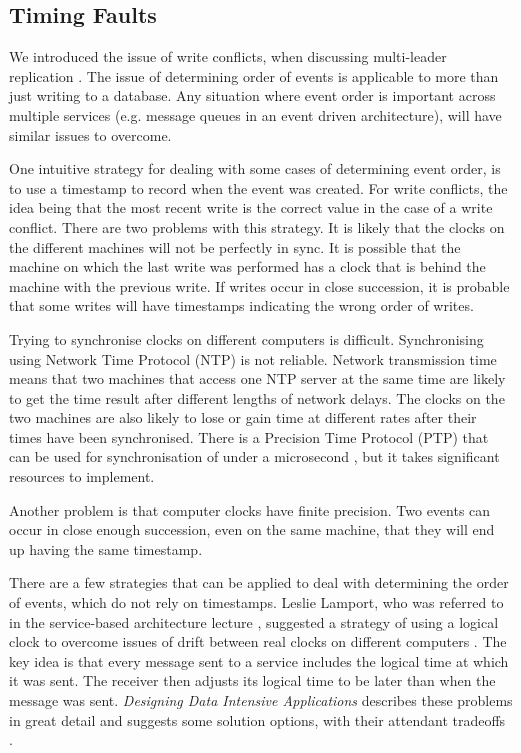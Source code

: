\subsection{Timing Faults}\label{timing}
We introduced the issue of write conflicts, when discussing multi-leader replication \cite{distributed2-notes}.
The issue of determining order of events is applicable to more than just writing to a database.
Any situation where event order is important across multiple services (e.g. message queues in an event driven architecture),
will have similar issues to overcome.

One intuitive strategy for dealing with some cases of determining event order,
is to use a timestamp to record when the event was created.
For write conflicts, the idea being that the most recent write is the correct value in the case of a write conflict.
There are two problems with this strategy.
It is likely that the clocks on the different machines will not be perfectly in sync.
It is possible that the machine on which the last write was performed has a clock that is behind the machine with the previous write.
If writes occur in close succession, it is probable that some writes will have timestamps indicating the wrong order of writes.

Trying to synchronise clocks on different computers is difficult.
Synchronising using Network Time Protocol (NTP) is not reliable.
Network transmission time means that two machines that access one NTP server at the same time
are likely to get the time result after different lengths of network delays.
The clocks on the two machines are also likely to lose or gain time at different rates after their times have been synchronised.
There is a Precision Time Protocol (PTP) that can be used for synchronisation of under a microsecond \cite{ieee-1588},
but it takes significant resources to implement.

Another problem is that computer clocks have finite precision.
Two events can occur in close enough succession, even on the same machine, that they will end up having the same timestamp.

There are a few strategies that can be applied to deal with determining the order of events, which do not rely on timestamps.
Leslie Lamport, who was referred to in the service-based architecture lecture \cite{service-based-slides},
suggested a strategy of using a logical clock to overcome issues of drift
between real clocks on different computers \cite{LamportLeslie1978Tcat}.
The key idea is that every message sent to a service includes the logical time at which it was sent.
The receiver then adjusts its logical time to be later than when the message was sent.
\textit{Designing Data Intensive Applications} describes these problems in great detail
and suggests some solution options, with their attendant tradeoffs \cite{data-intensive}.


